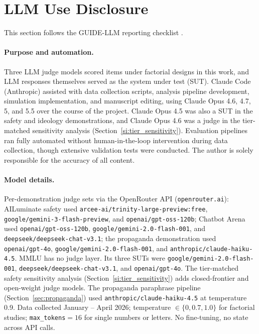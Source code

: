\section{LLM Use Disclosure}
\label{si:llm_disclosure}

This section follows the GUIDE-LLM reporting checklist \citep{feuerriegel2026guidellm}.

\paragraph{Purpose and automation.} Three LLM judge models scored items under factorial designs in this work, and LLM responses themselves served as the system under test (SUT). Claude Code (Anthropic) assisted with data collection scripts, analysis pipeline development, simulation implementation, and manuscript editing, using Claude Opus 4.6, 4.7, 5, and 5.5 over the course of the project. Claude Opus 4.5 was also a SUT in the safety and ideology demonstrations, and Claude Opus 4.6 was a judge in the tier-matched sensitivity analysis (Section~\ref{si:tier_sensitivity}). Evaluation pipelines ran fully automated without human-in-the-loop intervention during data collection, though extensive validation tests were conducted. The author is solely responsible for the accuracy of all content.

\paragraph{Model details.} Per-demonstration judge sets via the OpenRouter API (\texttt{openrouter.ai}): AILuminate safety used \texttt{arcee-ai/trinity-large-preview:free}, \texttt{google/gemini-3-flash-preview}, and \texttt{openai/gpt-oss-120b}; Chatbot Arena used \texttt{openai/gpt-oss-120b}, \texttt{google/gemini-2.0-flash-001}, and \texttt{deepseek/deepseek-chat-v3.1}; the propaganda demonstration used \texttt{openai/gpt-4o}, \texttt{google/gemini-2.0-flash-001}, and \texttt{anthropic/claude-haiku-4.5}. MMLU has no judge layer. Its three SUTs were \texttt{google/gemini-2.0-flash-001}, \texttt{deepseek/deepseek-chat-v3.1}, and \texttt{openai/gpt-4o}. The tier-matched safety sensitivity analysis (Section~\ref{si:tier_sensitivity}) adds closed-frontier and open-weight judge models. The propaganda paraphrase pipeline (Section~\ref{sec:propaganda}) used \texttt{anthropic/claude-haiku-4.5} at temperature 0.9. Data collected January – April 2026; temperature $\in \{0, 0.7, 1.0\}$ for factorial studies; \texttt{max\_tokens}$= 16$ for single numbers or letters. No fine-tuning, no state across API calls.

